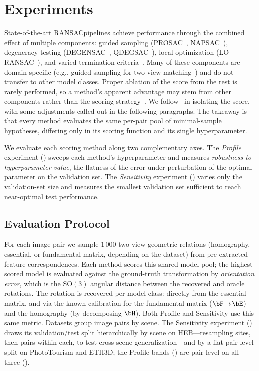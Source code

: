 \documentclass{article}
\newcommand{\mname}[1]{\texorpdfstring{#1\xspace}{#1}}
\newcommand{\ransac}{\mname{RANSAC}}
\newcommand{\loransac}{\mname{LO-RANSAC}}
\newcommand{\prosac}{\mname{PROSAC}}
\newcommand{\napsac}{\mname{NAPSAC}}
\newcommand{\degensac}{\mname{DEGENSAC}}
\newcommand{\qdegsac}{\mname{QDEGSAC}}
\newcommand{\phototourism}{\mname{PhotoTourism}}
\newcommand{\ethd}{\mname{ETH3D}}
\newcommand{\heb}{\mname{HEB}}
\begin{document}
\section{Experiments}
\label{sec:experiments}

State-of-the-art \ransac pipelines achieve performance through
the combined effect of multiple components: guided sampling
(\prosac~\cite{ChumMatas2005}, \napsac~\cite{Myatt2002napsac}),
degeneracy testing
(\degensac~\cite{Chum2005degensac}, \qdegsac~\cite{FrahmPollefeys2006qdegsac}),
local optimization
(\loransac~\cite{Chum2003,Lebeda2012}), and
varied termination criteria~\cite{Schoenberger2025stopping}.
Many of these components are domain-specific (e.g., guided
sampling for two-view matching~\cite{Barath2019pnapsac}) and do
not transfer to other model classes.  Proper
ablation of the score from the rest is rarely performed, so a
method's apparent advantage may stem from other components
rather than the scoring strategy~\cite{Shekhovtsov2025}.  We follow~\cite{Shekhovtsov2025} in isolating the score, with
some adjustments called out in the following paragraphs.  The
takeaway is that every method evaluates the same per-pair pool
of minimal-sample hypotheses, differing only in its scoring
function and its single hyperparameter.

We evaluate each scoring method along two
complementary axes.
The \emph{Profile} experiment () sweeps each
method's hyperparameter and measures \emph{robustness to
	hyperparameter value}, the flatness of the error under
perturbation of the optimal parameter on the validation set.
The \emph{Sensitivity} experiment ()
varies only the validation-set size and measures the smallest
validation set sufficient to reach near-optimal test
performance.

\subsection{Evaluation Protocol}
\label{sec:eval-protocol}

For each image pair we sample $1\,000$ two-view geometric
relations (homography, essential, or fundamental matrix,
depending on the dataset) from pre-extracted feature
correspondences.  Each method scores this shared model pool;
the highest-scored model is evaluated against the ground-truth
transformation by \emph{orientation error}, which is the
$\mathrm{SO}(3)$ angular distance between the recovered and
oracle rotations.  The rotation is recovered per model class:
directly from the essential matrix, and via the known
calibration for the fundamental matrix ($\bF\!\to\!\bE$) and the
homography (by decomposing $\bH$).  Both Profile and Sensitivity use this same
metric.  Datasets group image pairs by scene.  The Sensitivity
experiment () draws its
validation/test split hierarchically by scene on \heb---resampling
sites, then pairs within each, to test cross-scene
generalization---and by a flat pair-level split on \phototourism
and \ethd; the Profile bands () are pair-level
on all three ().
\end{document}
